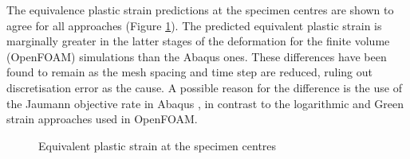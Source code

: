 \documentclass[sn-mathphys,Numbered,draft]{sn-jnl}%
\begin{document}
The equivalence plastic strain predictions at the specimen centres are shown to agree for all approaches (Figure \ref{fig:eqPlasticStrainPlasticity}).
The predicted equivalent plastic strain is marginally greater in the latter stages of the deformation for the finite volume (OpenFOAM) simulations than the Abaqus ones.
These differences have been found to remain as the mesh spacing and time step are reduced, ruling out discretisation error as the cause.
A possible reason for the difference is the use of the Jaumann objective rate in Abaqus \cite{soyarslan_finite_2010}, in contrast to the logarithmic and Green strain approaches used in OpenFOAM.
\begin{figure}[htbp]
	\centering
		
	\caption{Equivalent plastic strain at the specimen centres}
	\label{fig:eqPlasticStrainPlasticity}
\end{figure}
\end{document}
